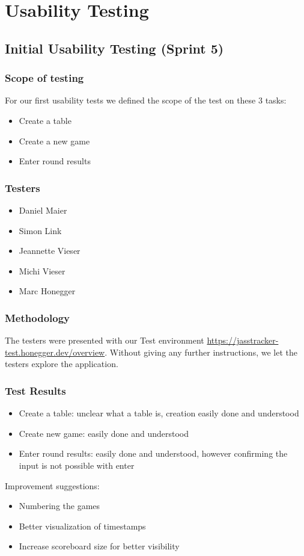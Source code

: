 \chapter{Usability Testing}\label{sec:uxTesting}

\section{Initial Usability Testing (Sprint 5)}

\subsection{Scope of testing}
For our first usability tests we defined the scope of the test on these 3 tasks:
\begin{itemize}
    \item Create a table
    \item Create a new game
    \item Enter round results
\end{itemize}

\subsection{Testers}
\begin{itemize}
    \item Daniel Maier
    \item Simon Link 
    \item Jeannette Vieser
    \item Michi Vieser
    \item Marc Honegger
\end{itemize}

\subsection{Methodology}
The testers were presented with our Test environment \url{https://jasstracker-test.honegger.dev/overview}.
Without giving any further instructions, we let the testers explore the application. 

\subsection{Test Results}
\begin{itemize}
    \item Create a table: unclear what a table is, creation easily done and understood
    \item Create new game: easily done and understood
    \item Enter round results: easily done and understood, however confirming the input is not possible with enter
\end{itemize}
Improvement suggestions: 
\begin{itemize}
    \item Numbering the games 
    \item Better visualization of timestamps
    \item Increase scoreboard size for better visibility
\end{itemize}


